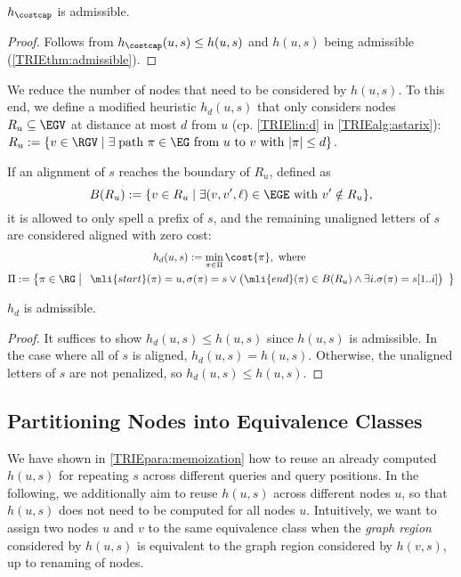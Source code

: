 \begin{samepage}
	\begin{thm} \label{TRIEthm:hcostcap_admissible}
		$h_{\costcap}$ is admissible.
	\end{thm}
	\begin{proof}
		Follows from $h_\costcap(u,s) \leq h(u,s)$ and $h(u,s)$ being admissible
		(\cref{TRIEthm:admissible}).
	\end{proof}
	\end{samepage}

We reduce the number of nodes that need to be considered by $h(u,s)$. To this
end, we define a modified heuristic $h_d(u,s)$ that only considers nodes $R_u
\subseteq \EGV$ at distance at most $d$ from $u$ (cp. \cref{TRIElin:d} in
\cref{TRIEalg:astarix}):
$
R_u := \{ v \in \RGV \mid \exists \; \text{path } \pi \in \EG \text{ from } u \text{ to } v \text{ with } \lvert \pi \rvert \leq d \}
$.

If an alignment of $s$ reaches the boundary of $R_u$, defined as $$B(R_u) := \{v
\in R_u \mid \exists (v,v',\ell) \in \EGE \text{ with } v' \notin R_u \},$$ it is
allowed to only spell a prefix of $s$, and the remaining unaligned letters of
$s$ are considered aligned with zero cost:
\begin{gather*}
h_d(u,s) := \min_{\pi \in \Pi} \cost{\pi}, \text{ where } \\
\Pi := \left\{ \pi \in \RG \;\middle|\; \begin{array}{c}
\mli{start}(\pi)=u, 
\sigma(\pi)=s \lor \big(\mli{end}(\pi)\in B(R_u) \land \exists i. \sigma(\pi)=s[1..i] \big)
\end{array}
\right\}
\end{gather*}

\begin{samepage}
\begin{thm} \label{TRIEthm:hbar_admissible}
	$h_d$ is admissible.
\end{thm}
\begin{proof}
	It suffices to show $h_d(u,s) \leq h(u, s)$ since $h(u, s)$ is admissible.
	In the case where all of $s$ is aligned, $h_d(u,s) = h(u, s)$. Otherwise,
	the unaligned letters of $s$ are not penalized, so $h_d(u,s) \leq h(u, s)$.
\end{proof}
\end{samepage}


\subsection{Partitioning Nodes into Equivalence Classes} \label{TRIEsubsec:partition}
We have shown in \cref{TRIEpara:memoization} how to reuse an already computed
$h(u,s)$ for repeating $s$ across different queries and query positions. In the
following, we additionally aim to reuse $h(u,s)$ across different nodes $u$, so
that $h(u,s)$ does not need to be computed for all nodes $u$. Intuitively, we
want to assign two nodes $u$ and $v$ to the same equivalence class when the
\emph{graph region} considered by $h(u,s)$ is equivalent to the graph region
considered by $h(v,s)$, up to renaming of nodes.

